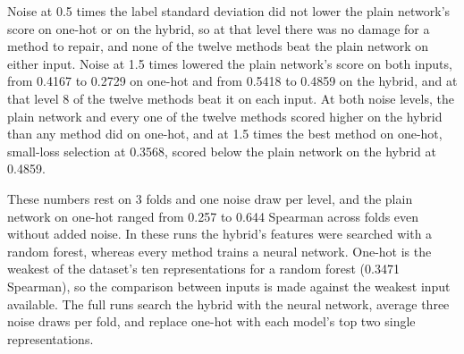 Noise at 0.5 times the label standard deviation did not lower the plain network's score on one-hot or on the hybrid, so at that level there was no damage for a method to repair, and none of the twelve methods beat the plain network on either input. Noise at 1.5 times lowered the plain network's score on both inputs, from 0.4167 to 0.2729 on one-hot and from 0.5418 to 0.4859 on the hybrid, and at that level 8 of the twelve methods beat it on each input. At both noise levels, the plain network and every one of the twelve methods scored higher on the hybrid than any method did on one-hot, and at 1.5 times the best method on one-hot, small-loss selection at 0.3568, scored below the plain network on the hybrid at 0.4859.

These numbers rest on 3 folds and one noise draw per level, and the plain network on one-hot ranged from 0.257 to 0.644 Spearman across folds even without added noise. In these runs the hybrid's features were searched with a random forest, whereas every method trains a neural network. One-hot is the weakest of the dataset's ten representations for a random forest (0.3471 Spearman), so the comparison between inputs is made against the weakest input available. The full runs search the hybrid with the neural network, average three noise draws per fold, and replace one-hot with each model's top two single representations.


